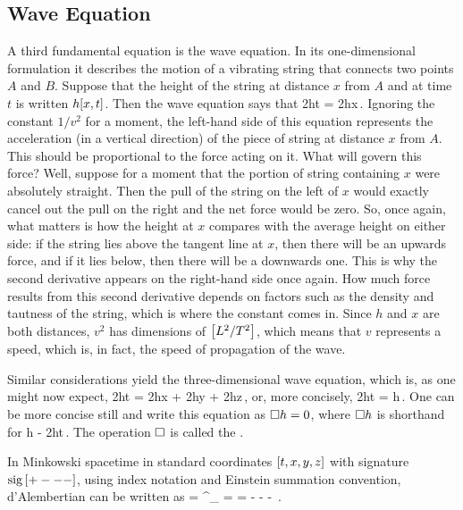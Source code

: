 \subsection{Wave Equation}
A third fundamental equation is the wave equation. In its one-dimensional formulation it describes the motion of a vibrating string that connects two points $A$ and $B$. Suppose that the height of the string at distance $x$ from $A$ and at time $t$ is written $h\!\left[{x,t}\right]$. Then the wave equation says that
\beq
{}\nxpd 2ht = \nxpd 2hx\,.
\eeq
Ignoring the constant $1/v^2$ for a moment, the left-hand side of this equation represents the acceleration (in a vertical direction) of the piece of string at distance $x$ from $A$. This should be proportional to the force acting on it. What will govern this force? Well, suppose for a moment that the portion of string containing $x$ were absolutely straight. Then the pull of the string on the left of $x$ would exactly cancel out the pull on the right and the net force would be zero. So, once again, what matters is how the height at $x$ compares with the average height on either side: if the string lies above the tangent line at $x$, then there will be an upwards force, and if it lies below, then there will be a downwards one. This is why the second derivative appears on the right-hand side once again. How much force results from this second derivative depends on factors such as the density and tautness of the string, which is where the constant comes in. Since $h$ and $x$ are both distances, $v^2$ has dimensions of $\left[{L^2/T^2}\right]$, which means that $v$ represents a speed, which is, in fact, the speed of propagation of the wave.

Similar considerations yield the three-dimensional wave equation, which is, as one might now expect,
\beq
{}\nxpd 2ht = \nxpd 2hx + \nxpd 2hy + \nxpd 2hz\,,
\eeq
or, more concisely,
\beq
{}\nxpd 2ht = \lder h\,.
\eeq
One can be more concise still and write this equation as $\square h = 0$, where $\square h$ is shorthand for
\beq
\lder h - \nxpd 2ht\,.
\eeq
The operation $\square$ is called the .

In Minkowski spacetime in standard coordinates $\left[{t,x,y,z}\right]$ with signature $\operatorname{sig}\left[{+---}\right]$, using index notation and Einstein summation convention, d'Alembertian can be written as
\beq
\dalder = \partial^\mu \partial_\nu 
        = \rmet\mu\nu\igder\mu\igder\nu
        =  -  -  -  \,.
\eeq


